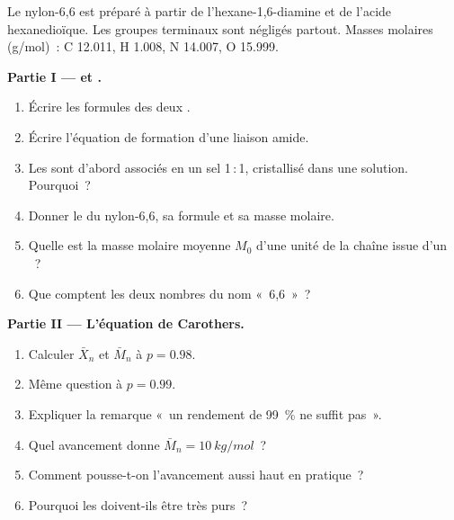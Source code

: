\begin{problem}
\label{pb:b2:polymer-synthesis:1}
Le nylon-6,6 est préparé à partir de l'hexane-1,6-diamine et de l'acide hexanedioïque. Les groupes
terminaux sont négligés partout. Masses molaires (\unit{g/mol})~: C 12.011, H 1.008, N 14.007, O 15.999.

\medskip
\noindent\textbf{Partie I ---  et .}
\begin{enumerate}
  \item Écrire les formules des deux .
  \item Écrire l'équation de formation d'une liaison amide.
  \item Les  sont d'abord associés en un sel 1\,:\,1, cristallisé dans une solution. Pourquoi~?
  \item Donner le  du nylon-6,6, sa formule et sa masse molaire.
  \item Quelle est la masse molaire moyenne $M_0$ d'une unité de la chaîne issue d'un ~?
  \item Que comptent les deux nombres du nom «~6,6~»~?
\end{enumerate}

\medskip
\noindent\textbf{Partie II --- L'équation de Carothers.}
\begin{enumerate}[resume]
  \item Calculer $\bar X_n$ et $\bar M_n$ à $p = 0.98$.
  \item Même question à $p = 0.99$.
  \item Expliquer la remarque «~un rendement de 99~\% ne suffit pas~».
  \item Quel avancement donne $\bar M_n = \qty{10}{kg/mol}$~?
  \item Comment pousse-t-on l'avancement aussi haut en pratique~?
  \item Pourquoi les  doivent-ils être très purs~?
\end{enumerate}


\end{problem}
